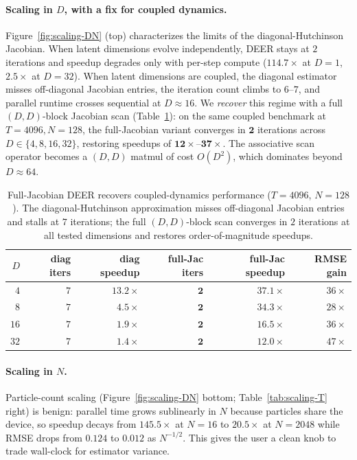 \documentclass{article}
\begin{document}
\paragraph{Scaling in $D$, with a fix for coupled dynamics.} Figure~\ref{fig:scaling-DN} (top) characterizes the limits of the diagonal-Hutchinson Jacobian. When latent dimensions evolve independently, DEER stays at $2$ iterations and speedup degrades only with per-step compute ($114.7\times$ at $D=1$, $2.5\times$ at $D=32$). When latent dimensions are coupled, the diagonal estimator misses off-diagonal Jacobian entries, the iteration count climbs to $6$--$7$, and parallel runtime crosses sequential at $D \approx 16$. We \emph{recover} this regime with a full $(D,D)$-block Jacobian scan (Table~\ref{tab:fulljac}): on the same coupled benchmark at $T=4096, N=128$, the full-Jacobian variant converges in $\mathbf{2}$ iterations across $D \in \{4, 8, 16, 32\}$, restoring speedups of $\mathbf{12\times}$--$\mathbf{37\times}$. The associative scan operator becomes a $(D,D)$ matmul of cost $O(D^2)$, which dominates beyond $D \approx 64$.

\begin{table}[t]
\caption{Full-Jacobian DEER recovers coupled-dynamics performance ($T=4096$, $N=128$). The diagonal-Hutchinson approximation misses off-diagonal Jacobian entries and stalls at $7$ iterations; the full $(D,D)$-block scan converges in $2$ iterations at all tested dimensions and restores order-of-magnitude speedups.}
\label{tab:fulljac}
\centering
\small
\begin{tabular}{rrrrrr}
\toprule
$D$ & diag iters & diag speedup & full-Jac iters & full-Jac speedup & RMSE gain \\
\midrule
$4$  & $7$ & $13.2\times$ & $\mathbf{2}$ & $\mathbf{37.1\times}$ & $36\times$ \\
$8$  & $7$ & $4.5\times$  & $\mathbf{2}$ & $\mathbf{34.3\times}$ & $28\times$ \\
$16$ & $7$ & $1.9\times$  & $\mathbf{2}$ & $\mathbf{16.5\times}$ & $36\times$ \\
$32$ & $7$ & $1.4\times$  & $\mathbf{2}$ & $\mathbf{12.0\times}$ & $47\times$ \\
\bottomrule
\end{tabular}
\end{table}

\paragraph{Scaling in $N$.} Particle-count scaling (Figure~\ref{fig:scaling-DN} bottom; Table~\ref{tab:scaling-T} right) is benign: parallel time grows sublinearly in $N$ because particles share the device, so speedup decays from $145.5\times$ at $N{=}16$ to $20.5\times$ at $N{=}2048$ while RMSE drops from $0.124$ to $0.012$ as $N^{-1/2}$. This gives the user a clean knob to trade wall-clock for estimator variance.
\end{document}
